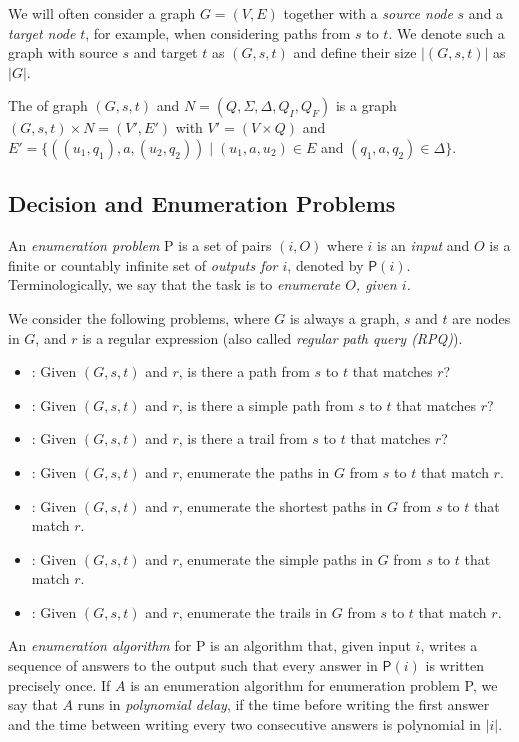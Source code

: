 \documentclass[a4paper,english]{lipics-v2016}
\theoremstyle{plain}
\begin{document}
We will often consider a graph $G = (V,E)$ together with a
\emph{source node} $s$ and a \emph{target node} $t$, for example, when
considering paths from $s$ to $t$. We denote such a graph with source
$s$ and target $t$ as $(G,s,t)$ and define their size $|(G,s,t)|$ as $|G|$.


The \emph{\product} of graph $(G,s,t)$ and \nfa $N =
(Q,\Sigma,\Delta,Q_I,Q_F)$ is a graph $(G,s,t)\times N = (V',E')$ with $V' = (V \times Q)$ and $E' = \{((u_1,q_1), a, (u_2,q_2)) \mid (u_1,a,u_2) \in E$ and $(q_1,a,q_2)
\in \Delta\}$. 
  


\subsection{Decision and Enumeration Problems}


An \emph{enumeration problem} \textsf{P} is a set of pairs $(i,O)$ where $i$
is an \emph{input} and $O$ is a finite or countably infinite set of
\emph{outputs for $i$}, denoted by $\textsf{P}(i)$. Terminologically, we say
that the task is to \emph{enumerate $O$, given $i$.}


We consider the following problems, where $G$ is always a graph, $s$
and $t$ are nodes in $G$, and $r$ is a regular expression (also called
\emph{regular path query (RPQ)}).
\begin{itemize}
\item \pth: Given $(G,s,t)$ and $r$, is there a path from $s$ to
  $t$ that matches $r$?
\item \nodespath:  Given $(G,s,t)$ and $r$,  is
   there a simple path from $s$ to $t$ that matches $r$?
 \item \edgespath: Given $(G,s,t)$ and $r$,  is
 there a trail from $s$ to $t$ that matches $r$?
 \item \enumpaths: Given $(G,s,t)$ and $r$,  enumerate the paths in $G$ from $s$ to $t$
   that match $r$.
 \item \enumshortpaths: Given $(G,s,t)$ and $r$,  enumerate the shortest paths in $G$ from $s$ to $t$
   that match $r$.
 \item \enumnodespaths: Given $(G,s,t)$ and $r$,  enumerate the simple paths in $G$ from $s$ to $t$
   that match $r$.
   \item\enumedgespaths: Given $(G,s,t)$ and $r$, enumerate the trails in $G$ from $s$ to $t$
   that match $r$.
\end{itemize}
An \emph{enumeration algorithm} for \textsf{P} is an algorithm that, given
input $i$, writes a sequence of answers to the output such that every
answer in $\textsf{P}(i)$ is written precisely once. If $A$ is an enumeration
algorithm for enumeration problem \textsf{P}, we say that $A$ runs in
\emph{polynomial delay}, if the time before writing the
first answer and the time between writing every two consecutive
answers is polynomial in $|i|$.
\end{document}
